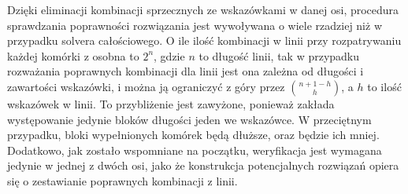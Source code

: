     Dzięki eliminacji kombinacji sprzecznych ze wskazówkami w danej osi, procedura sprawdzania
poprawności rozwiązania jest wywoływana o wiele rzadziej niż w przypadku solvera całościowego.
O ile ilość kombinacji w linii przy rozpatrywaniu każdej komórki z osobna to $2^n$, gdzie $n$ to
długość linii, tak w przypadku rozważania poprawnych kombinacji dla linii jest ona zależna od
długości i zawartości wskazówki, i można ją ograniczyć z góry przez
${n + 1 - h} \choose h$, a $h$ to ilość wskazówek w linii. To przybliżenie jest zawyżone, ponieważ
zakłada występowanie jedynie bloków długości jeden we wskazówce. W przeciętnym przypadku, bloki
wypełnionych komórek będą dłuższe, oraz będzie ich mniej. Dodatkowo, jak zostało wspomniane na początku,
weryfikacja jest wymagana jedynie w jednej z dwóch osi, jako że konstrukcja potencjalnych rozwiązań
opiera się o zestawianie poprawnych kombinacji z linii.
